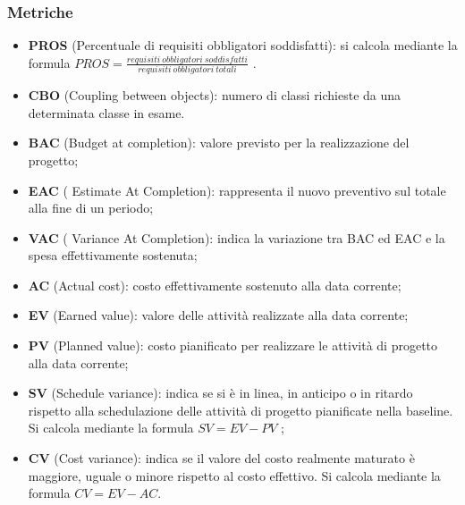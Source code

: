 \subsubsection{Metriche}
\begin{itemize}
	\item \textbf{PROS} (Percentuale di requisiti obbligatori soddisfatti): si calcola mediante la formula \newline $PROS = \frac{requisiti\ obbligatori\ soddisfatti}{requisiti\ obbligatori\ totali}$ .
\end{itemize}
\begin{itemize}
	\item \textbf{CBO} (Coupling between objects): numero di classi richieste da una determinata classe in esame.
\end{itemize}
\begin{itemize}
	\item \textbf{BAC} (Budget at completion): valore previsto per la realizzazione del progetto;
	\item \textbf{EAC} ( Estimate At Completion): rappresenta il nuovo preventivo sul totale alla fine di un periodo;
	\item \textbf{VAC} ( Variance At Completion): indica la variazione tra BAC ed EAC e la spesa effettivamente sostenuta;
	\item \textbf{AC} (Actual cost): costo effettivamente sostenuto alla data corrente;
	\item \textbf{EV} (Earned value): valore delle attività realizzate alla data corrente;
	\item \textbf{PV} (Planned value): costo pianificato per realizzare le attività di progetto alla data corrente;
	\item \textbf{SV} (Schedule variance): indica se si è in linea, in anticipo o in ritardo rispetto alla schedulazione delle attività di progetto pianificate nella baseline. Si calcola mediante la formula $SV = EV - PV$ ;
	\item \textbf{CV} (Cost variance): indica se il valore del costo realmente maturato è maggiore, uguale o minore rispetto al costo effettivo. Si calcola mediante la formula $CV = EV - AC$.
\end{itemize}
